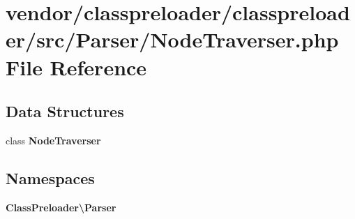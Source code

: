 \section{vendor/classpreloader/classpreloader/src/\+Parser/\+Node\+Traverser.php File Reference}
\label{classpreloader_2classpreloader_2src_2_parser_2_node_traverser_8php}
\subsection*{Data Structures}
\begin{DoxyCompactItemize}
\item 
class {\bf Node\+Traverser}
\end{DoxyCompactItemize}
\subsection*{Namespaces}
\begin{DoxyCompactItemize}
\item 
 {\bf Class\+Preloader\textbackslash{}\+Parser}
\end{DoxyCompactItemize}

